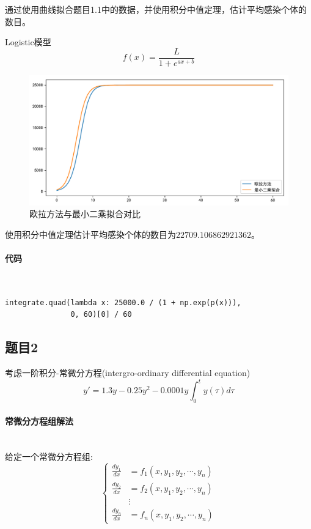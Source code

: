 通过使用曲线拟合题目1.1中的数据，并使用积分中值定理，估计平均感染个体的数目。

Logistic模型
$$f(x) = \frac{L}{1 + e^{ax + b}}$$

\begin{figure}[H]
	\centering
	\caption{欧拉方法与最小二乘拟合对比}
	\includegraphics[width=\linewidth]{fig30.pdf}
\end{figure}

使用积分中值定理估计平均感染个体的数目为$22709.106862921362$。

\paragraph{代码}
~\\
\begin{verbatim}
integrate.quad(lambda x: 25000.0 / (1 + np.exp(p(x))), 
               0, 60)[0] / 60
\end{verbatim}

\pagebreak

\subsection{题目2}

考虑一阶积分-常微分方程(intergro-ordinary differential equation) $$y'=1.3y-0.25y^2-0.0001y\int_0^ty(\tau)d\tau$$

\paragraph{常微分方程组解法}
~\\
给定一个常微分方程组:
$$\left\{
\begin{aligned}
\frac{dy_1}{dx} &= f_1\left(x,y_1,y_2,\cdots,y_n \right) \\
\frac{dy_2}{dx} &= f_2\left(x,y_1,y_2,\cdots,y_n \right) \\
&\vdots \\
\frac{dy_n}{dx} &= f_n\left(x,y_1,y_2,\cdots,y_n \right)
\end{aligned}
\right.$$

